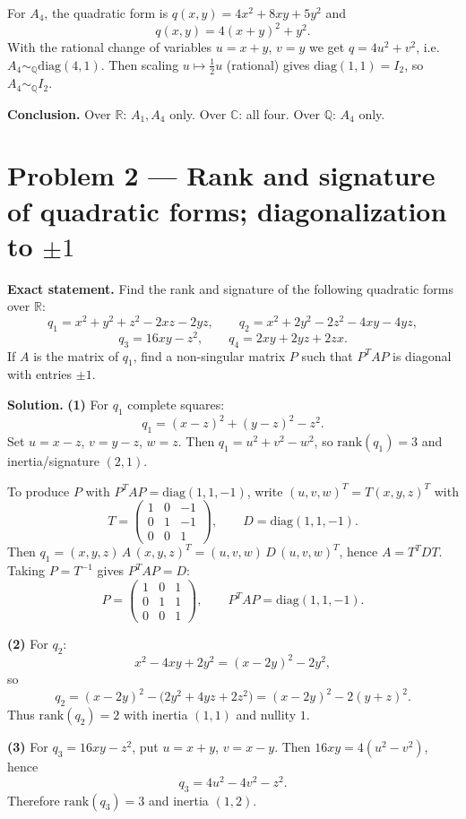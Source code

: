 \documentclass[12pt,a4paper]{article}
\theoremstyle{plain}
\theoremstyle{definition}      %
\begin{document}
For $A_4$, the quadratic form is $q(x,y)=4x^2+8xy+5y^2$ and
\[
q(x,y)=4(x+y)^2+y^2.
\]
With the rational change of variables $u=x+y$, $v=y$ we get $q=4u^2+v^2$, i.e.\ $A_4\sim_{\mathbb Q}\mathrm{diag}(4,1)$.
Then scaling $u\mapsto \tfrac12 u$ (rational) gives $\mathrm{diag}(1,1)=I_2$, so $A_4\sim_{\mathbb Q} I_2$.

\medskip
\noindent
\textbf{Conclusion.}
Over $\mathbb R$: $A_1,A_4$ only.
Over $\mathbb C$: all four.
Over $\mathbb Q$: $A_4$ only.


\section{Problem 2 — Rank and signature of quadratic forms; diagonalization to $\pm 1$}

\textbf{Exact statement.}
Find the rank and signature of the following quadratic forms over $\mathbb R$:
\[
q_1=x^2+y^2+z^2-2xz-2yz,\qquad
q_2=x^2+2y^2-2z^2-4xy-4yz,
\]
\[
q_3=16xy-z^2,\qquad
q_4=2xy+2yz+2zx.
\]
If $A$ is the matrix of $q_1$, find a non-singular matrix $P$ such that $P^TAP$ is diagonal with entries $\pm 1$.

\textbf{Solution.}
\textbf{(1) } For $q_1$ complete squares:
\[
q_1=(x-z)^2+(y-z)^2-z^2.
\]
Set $u=x-z$, $v=y-z$, $w=z$. Then $q_1=u^2+v^2-w^2$, so $\mathrm{rank}(q_1)=3$ and inertia/signature $(2,1)$.

To produce $P$ with $P^TAP=\mathrm{diag}(1,1,-1)$, write $(u,v,w)^T=T(x,y,z)^T$ with
\[
T=\begin{pmatrix}1&0&-1\\[2pt]0&1&-1\\[2pt]0&0&1\end{pmatrix},\qquad D=\mathrm{diag}(1,1,-1).
\]
Then $q_1=(x,y,z)\,A\,(x,y,z)^T=(u,v,w)\,D\,(u,v,w)^T$, hence $A=T^TDT$.
Taking $P=T^{-1}$ gives $P^TAP=D$:
\[
P=\begin{pmatrix}1&0&1\\[2pt]0&1&1\\[2pt]0&0&1\end{pmatrix},\qquad
P^TAP=\mathrm{diag}(1,1,-1).
\]

\textbf{(2) } For $q_2$:
\[
x^2-4xy+2y^2=(x-2y)^2-2y^2,
\]
so
\[
q_2=(x-2y)^2-\bigl(2y^2+4yz+2z^2\bigr)=(x-2y)^2-2(y+z)^2.
\]
Thus $\mathrm{rank}(q_2)=2$ with inertia $(1,1)$ and nullity $1$.

\textbf{(3) } For $q_3=16xy-z^2$, put $u=x+y$, $v=x-y$. Then $16xy=4(u^2-v^2)$, hence
\[
q_3=4u^2-4v^2-z^2.
\]
Therefore $\mathrm{rank}(q_3)=3$ and inertia $(1,2)$.
\end{document}
